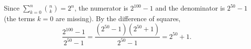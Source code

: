 Since $\displaystyle\sum_{k=0}^{n}\binom nk=2^n$, the numerator is $2^{100}-1$ and the denominator is $2^{50}-1$ (the terms $k=0$ are missing). By the difference of squares,
\[\dfrac{2^{100}-1}{2^{50}-1}=\dfrac{\left(2^{50}-1\right)\left(2^{50}+1\right)}{2^{50}-1}=\boxed{2^{50}+1}.\]
